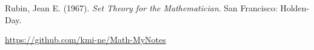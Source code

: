 \documentclass[lualatex, ja=standard]{bxjsreport}
\begin{document}
Rubin, Jean E. (1967). \textit{Set Theory for the Mathematician}. San Francisco: Holden-Day.

\url{https://github.com/kmi-ne/Math-MyNotes}



% 
\end{document}
